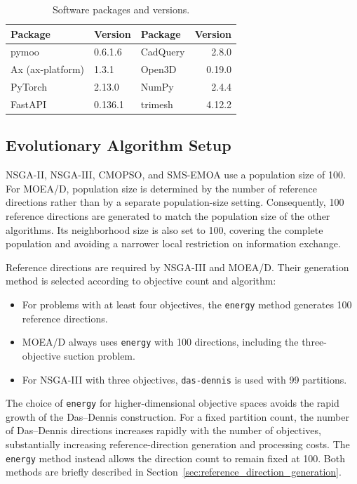 \begin{table}[htbp]
\centering
\caption{Software packages and versions.}
\label{tab:software}
\begin{tabular}{@{}lllr@{}}
\toprule
\textbf{Package} & \textbf{Version} & \textbf{Package} & \textbf{Version} \\
\midrule
pymoo        & 0.6.1.6 & CadQuery & 2.8.0  \\
Ax (ax-platform) & 1.3.1 & Open3D   & 0.19.0 \\
PyTorch      & 2.13.0  & NumPy    & 2.4.4  \\
FastAPI      & 0.136.1 & trimesh  & 4.12.2 \\
\bottomrule
\end{tabular}
\end{table}
\subsection{Evolutionary Algorithm Setup}
\label{sec:two_finger_initialization}

NSGA-II, NSGA-III, CMOPSO, and SMS-EMOA use a population size of 100.
For MOEA/D, population size is determined by the number of reference
directions rather than by a separate population-size setting.
Consequently, 100 reference directions are generated to match the population
size of the other algorithms. Its neighborhood size is also set to 100,
covering the complete population and avoiding a narrower local restriction
on information exchange.

Reference directions are required by NSGA-III and MOEA/D. Their generation
method is selected according to objective count and algorithm:
\begin{itemize}
    \item For problems with at least four objectives, the \texttt{energy}
          method generates 100 reference directions.
    \item MOEA/D always uses \texttt{energy} with 100 directions, including
          the three-objective suction problem.
    \item For NSGA-III with three objectives, \texttt{das-dennis} is used
          with 99 partitions.
\end{itemize}

The choice of \texttt{energy} for higher-dimensional objective spaces avoids
the rapid growth of the Das--Dennis construction. For a fixed partition count,
the number of Das--Dennis directions increases rapidly with the number of
objectives, substantially increasing reference-direction generation and
processing costs. The \texttt{energy} method instead allows the direction
count to remain fixed at 100. Both methods are briefly described in
Section~\ref{sec:reference_direction_generation}.

